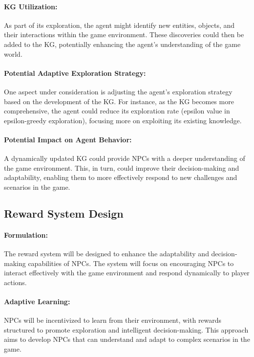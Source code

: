 \documentclass{article}
\begin{document}
\paragraph{KG Utilization:}
As part of its exploration, the agent might identify new entities, objects, and their interactions within the game environment. These discoveries could then be added to the KG, potentially enhancing the agent's understanding of the game world.

\paragraph{Potential Adaptive Exploration Strategy:}
One aspect under consideration is adjusting the agent's exploration strategy based on the development of the KG. For instance, as the KG becomes more comprehensive, the agent could reduce its exploration rate (epsilon value in epsilon-greedy exploration), focusing more on exploiting its existing knowledge.

\paragraph{Potential Impact on Agent Behavior:}
A dynamically updated KG could provide NPCs with a deeper understanding of the game environment. This, in turn, could improve their decision-making and adaptability, enabling them to more effectively respond to new challenges and scenarios in the game.

\subsection{Reward System Design}
\paragraph{Formulation:}
The reward system will be designed to enhance the adaptability and decision-making capabilities of NPCs. The system will focus on encouraging NPCs to interact effectively with the game environment and respond dynamically to player actions.

\paragraph{Adaptive Learning:}
NPCs will be incentivized to learn from their environment, with rewards structured to promote exploration and intelligent decision-making. This approach aims to develop NPCs that can understand and adapt to complex scenarios in the game.
\end{document}
